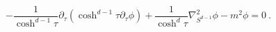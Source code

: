 \begin{equation}\label{eqglob}
-\frac{1}{\cosh^{d-1}\tau}
\partial_\tau(\cosh^{d-1}\tau \partial_{\tau}\phi)+
\frac{1}{\cosh^{d}\tau}\nabla_{S^{d-1}}^2\phi
-m^2\phi=0 \ .
\end{equation}

